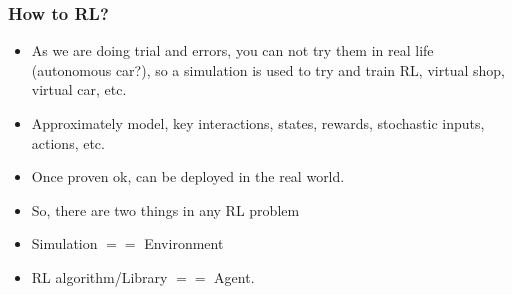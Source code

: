 











\begin{frame}[fragile]\frametitle{How to RL?}

\begin{itemize}
\item As we are doing trial and errors, you can not try them in real life (autonomous car?), so a simulation is used to try and train RL, virtual shop, virtual car, etc.
\item Approximately model, key interactions, states, rewards, stochastic inputs, actions, etc.
\item Once proven ok, can be deployed in the real world.
\item So, there are two things in any RL problem
\item Simulation $==$ Environment
\item RL algorithm/Library $==$ Agent.
\end{itemize}
\end{frame}

